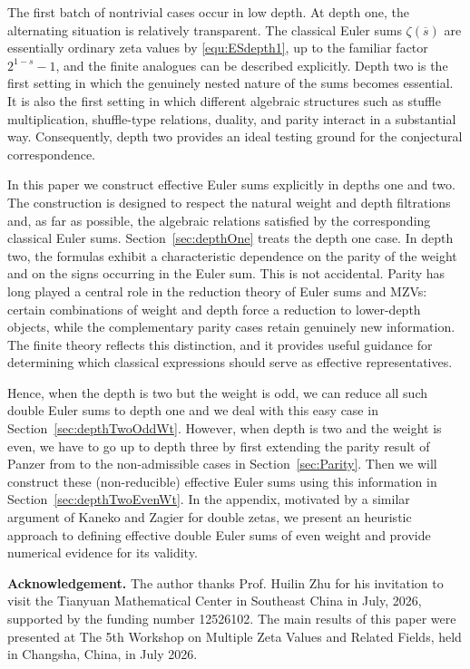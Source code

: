 \documentclass{article}
\newcommand{\ol}{\overline}
\theoremstyle{plain}
\theoremstyle{definition}
\begin{document}
The first batch of nontrivial cases occur in low depth. At depth one, the alternating situation is relatively transparent. The classical Euler sums $\zeta(\ol{s})$ are essentially ordinary zeta values by \eqref{equ:ESdepth1}, up to the familiar factor $2^{1-s}-1$, and the finite analogues can be described explicitly. Depth two is the first setting in which the genuinely nested nature of the sums becomes essential. It is also the first setting in which different algebraic structures such as stuffle multiplication, shuffle-type relations, duality, and parity interact in a substantial way. Consequently, depth two provides an ideal testing ground for the conjectural correspondence.

In this paper we construct effective Euler sums explicitly in depths one and two. The construction is designed to respect the natural weight and depth filtrations and, as far as possible, the algebraic relations satisfied by the corresponding classical Euler sums. Section~\ref{sec:depthOne} treats the depth one case. In depth two, the formulas exhibit a characteristic dependence on the parity of the weight and on the signs occurring in the Euler sum. This is not accidental. Parity has long played a central role in the reduction theory of Euler sums and MZVs: certain combinations of weight and depth force a reduction to lower-depth objects, while the complementary parity cases retain genuinely new information. The finite theory reflects this distinction, and it provides useful guidance for determining which classical expressions should serve as effective representatives.

Hence, when the depth is two but the weight is odd, we can reduce all such double Euler sums to depth one and we deal with this easy case in Section~\ref{sec:depthTwoOddWt}. However, when depth is two and the weight is even, we have to go up to depth three by first extending the parity result of Panzer from \cite{Panzer2017} to the non-admissible cases in Section~\ref{sec:Parity}. Then we will construct these (non-reducible) effective Euler sums using this information in Section~\ref{sec:depthTwoEvenWt}. In the appendix, motivated by a similar argument of Kaneko and Zagier for double zetas, we present an heuristic approach to defining effective double Euler sums of even weight and provide numerical evidence for its validity.

\medskip
\textbf{Acknowledgement.} The author thanks Prof. Huilin Zhu for his invitation to visit the Tianyuan Mathematical Center in Southeast China in July, 2026, supported by the funding number 12526102. The main results of this paper were presented at The 5th Workshop on Multiple Zeta Values and Related Fields, held in Changsha, China, in July 2026.
\end{document}
